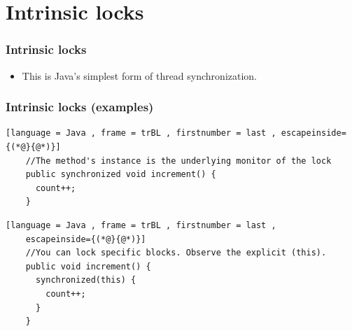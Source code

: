 \documentclass[xcolor={dvipsnames,svgnames},aspectratio=169]{beamer}
\begin{document}
\section{Intrinsic locks}

\begin{frame}[fragile]
  \frametitle{Intrinsic locks}

  \begin{itemize}
  \item[\faLock] This is Java’s simplest form of thread synchronization.
  \end{itemize}


\end{frame}

\begin{frame}[fragile]
  \frametitle{Intrinsic locks (examples)}

  \begin{lstlisting}[language = Java , frame = trBL , firstnumber = last , escapeinside={(*@}{@*)}]
    //The method's instance is the underlying monitor of the lock
    public synchronized void increment() {
      count++;
    }
  \end{lstlisting}

  \begin{lstlisting}[language = Java , frame = trBL , firstnumber = last ,
    escapeinside={(*@}{@*)}]
    //You can lock specific blocks. Observe the explicit (this).
    public void increment() {
      synchronized(this) {
        count++;
      }
    }
  \end{lstlisting}

\end{frame}
\end{document}
